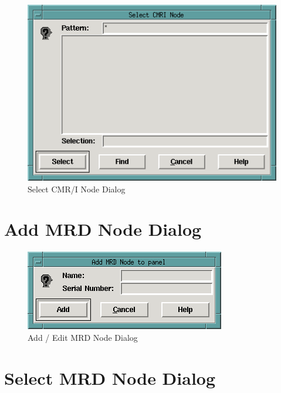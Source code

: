 \begin{figure}[hbpt]
\begin{centering}
\includegraphics{SelectCMRINodeDialog.png}
\caption{Select CMR/I Node Dialog}
\label{fig:dispatcher:selectcmrinodedialog}
\end{centering}
\end{figure}

\section{Add MRD Node Dialog}

\begin{figure}[hbpt]
\begin{centering}
\includegraphics{AddEditMRDNode.png}
\caption{Add / Edit MRD Node Dialog}
\label{fig:dispatcher:addeditmrdnodedialog}
\end{centering}
\end{figure}

\section{Select MRD Node Dialog}

